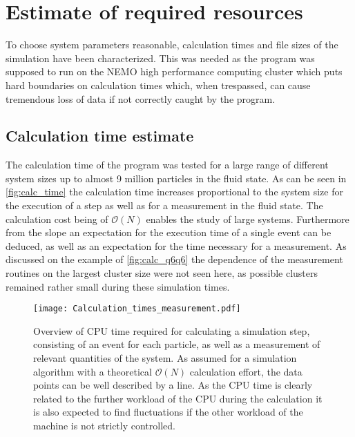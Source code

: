 \section{Estimate of required resources}
\label{sec:resources}
To choose system parameters reasonable, calculation times and file sizes of the simulation have been characterized. This was needed as the program was supposed to run on the NEMO high performance computing cluster which puts hard boundaries on calculation times which, when trespassed, can cause tremendous loss of data if not correctly caught by the program.\\
 
\subsection{Calculation time estimate}
\label{sec:calc_times}
The calculation time of the program was tested for a large range of different system sizes up to almost 9 million particles in the fluid state. As can be seen in \autoref{fig:calc_time} the calculation time increases proportional to the system size for the execution of a step as well as for a measurement in the fluid state. The calculation cost being of $\mathcal{O}(N)$ enables the study of large systems. Furthermore from the slope an expectation for the execution time of a single event can be deduced, as well as an expectation for the time necessary for a measurement. As discussed on the example of \autoref{fig:calc_q6q6} the dependence of the measurement routines on the largest cluster size were not seen here, as possible clusters remained rather small during these simulation times.\\

\begin{figure}[h!]
\centering
\texttt{[image: Calculation\_times\_measurement.pdf]}
\caption[Calculation time estimate]{Overview of CPU time required for calculating a simulation step, consisting of an event for each particle, as well as a measurement of relevant quantities of the system. As assumed for a simulation algorithm with a theoretical $\mathcal{O}(N)$ calculation effort, the data points can be well described by a line. As the CPU time is clearly related to the further workload of the CPU during the calculation it is also expected to find fluctuations if the other workload of the machine is not strictly controlled.}
\label{fig:calc_time}
\end{figure}

